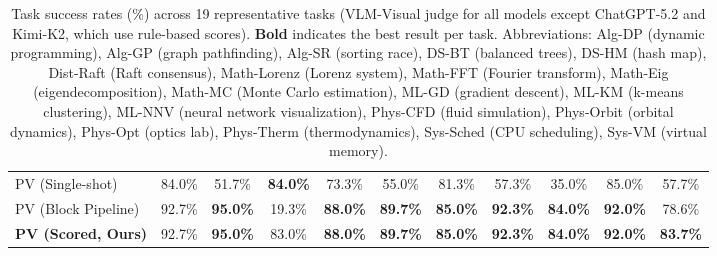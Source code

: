 \begin{table}[t]
{{\begin{tabular}{@{}lcccccccccc@{}}
\midrule
PV (Single-shot) & 84.0\% & 51.7\% & \textbf{84.0\%} & 73.3\% & 55.0\% & 81.3\% & 57.3\% & 35.0\% & 85.0\% & 57.7\% \\
PV (Block Pipeline) & 92.7\% & \textbf{95.0\%} & 19.3\% & \textbf{88.0\%} & \textbf{89.7\%} & \textbf{85.0\%} & \textbf{92.3\%} & \textbf{84.0\%} & \textbf{92.0\%} & 78.6\% \\
\textbf{PV (Scored, Ours)} & 92.7\% & \textbf{95.0\%} & 83.0\% & \textbf{88.0\%} & \textbf{89.7\%} & \textbf{85.0\%} & \textbf{92.3\%} & \textbf{84.0\%} & \textbf{92.0\%} & \textbf{83.7\%} \\
\bottomrule \bottomrule
\end{tabular}
}}
\caption{
Task success rates (\%) across 19 representative tasks (VLM-Visual judge for all models except ChatGPT-5.2 and Kimi-K2, which use rule-based scores).
\textbf{Bold} indicates the best result per task.
Abbreviations: Alg-DP (dynamic programming), Alg-GP (graph pathfinding), Alg-SR (sorting race),
DS-BT (balanced trees), DS-HM (hash map), Dist-Raft (Raft consensus),
Math-Lorenz (Lorenz system), Math-FFT (Fourier transform), Math-Eig (eigendecomposition), Math-MC (Monte Carlo estimation),
ML-GD (gradient descent), ML-KM (k-means clustering), ML-NNV (neural network visualization),
Phys-CFD (fluid simulation), Phys-Orbit (orbital dynamics), Phys-Opt (optics lab), Phys-Therm (thermodynamics),
Sys-Sched (CPU scheduling), Sys-VM (virtual memory).
}
\label{tab:task_breakdown}
\end{table}